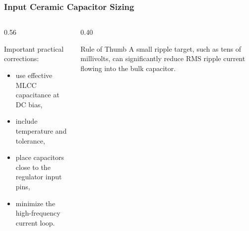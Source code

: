 \begin{frame}
\frametitle{Input Ceramic Capacitor Sizing}

\begin{columns}
\begin{column}{0.56\textwidth}

Important practical corrections:
\begin{itemize}
    \item use effective MLCC capacitance at DC bias,
    \item include temperature and tolerance,
    \item place capacitors close to the regulator input pins,
    \item minimize the high-frequency current loop.
\end{itemize}
\end{column}

\begin{column}{0.40\textwidth}

\begin{block}{Rule of Thumb}
\small
A small ripple target, such as tens of millivolts, can significantly reduce RMS ripple current flowing into the bulk capacitor.
\end{block}
\end{column}
\end{columns}

\end{frame}


